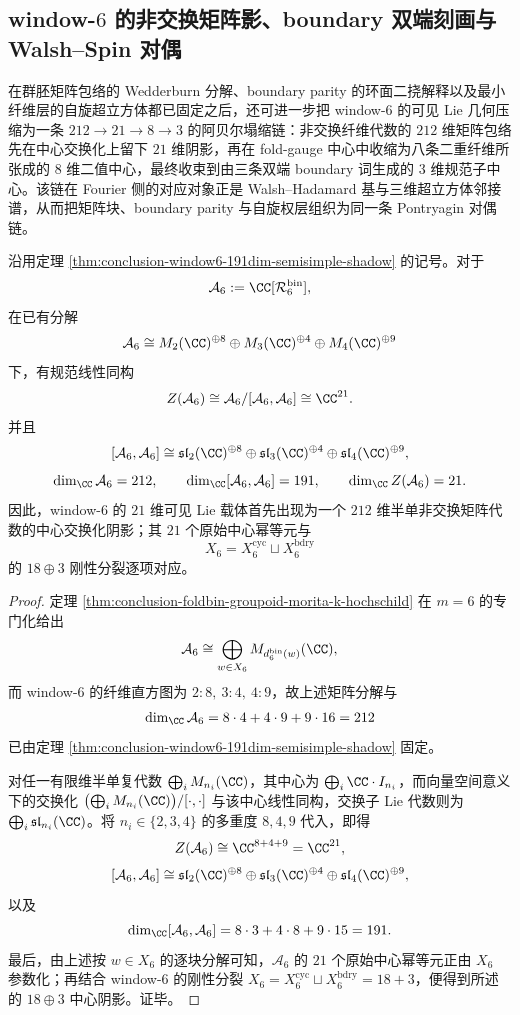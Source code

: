 \subsection{window-\texorpdfstring{$6$}{6} 的非交换矩阵影、boundary 双端刻画与 Walsh--Spin 对偶}\label{subsec:conclusion-window6-matrix-shadow-boundary-walsh-duality}
在群胚矩阵包络的 Wedderburn 分解、boundary parity 的环面二挠解释以及最小纤维层的自旋超立方体都已固定之后，还可进一步把 window-\(6\) 的可见 Lie 几何压缩为一条 \(212\to 21\to 8\to 3\) 的阿贝尔塌缩链：非交换纤维代数的 \(212\) 维矩阵包络先在中心交换化上留下 \(21\) 维阴影，再在 fold-gauge 中心中收缩为八条二重纤维所张成的 \(8\) 维二值中心，最终收束到由三条双端 boundary 词生成的 \(3\) 维规范子中心。该链在 Fourier 侧的对应对象正是 Walsh--Hadamard 基与三维超立方体邻接谱，从而把矩阵块、boundary parity 与自旋权层组织为同一条 Pontryagin 对偶链。

\begin{theorem}\label{thm:conclusion-window6-matrix-envelope-abelian-shadow}
沿用定理 \ref{thm:conclusion-window6-191dim-semisimple-shadow} 的记号。对于
\[
\mathcal A_6:=\CC[\mathcal R_6^{\mathrm{bin}}],
\]
在已有分解
\[
\mathcal A_6
\cong
M_2(\CC)^{\oplus 8}\oplus M_3(\CC)^{\oplus 4}\oplus M_4(\CC)^{\oplus 9}
\]
下，有规范线性同构
\[
Z(\mathcal A_6)
\cong
\mathcal A_6/[\mathcal A_6,\mathcal A_6]
\cong
\CC^{21}.
\]
并且
\[
[\mathcal A_6,\mathcal A_6]
\cong
\mathfrak{sl}_2(\CC)^{\oplus 8}
\oplus
\mathfrak{sl}_3(\CC)^{\oplus 4}
\oplus
\mathfrak{sl}_4(\CC)^{\oplus 9},
\]
\[
\dim_{\CC}\mathcal A_6=212,\qquad
\dim_{\CC}[\mathcal A_6,\mathcal A_6]=191,\qquad
\dim_{\CC} Z(\mathcal A_6)=21.
\]
因此，window-\(6\) 的 \(21\) 维可见 Lie 载体首先出现为一个 \(212\) 维半单非交换矩阵代数的中心交换化阴影；其 \(21\) 个原始中心幂等元与
\[
X_6=X_6^{\mathrm{cyc}}\sqcup X_6^{\mathrm{bdry}}
\]
的 \(18\oplus 3\) 刚性分裂逐项对应。
\end{theorem}
\begin{proof}
定理 \ref{thm:conclusion-foldbin-groupoid-morita-k-hochschild} 在 \(m=6\) 的专门化给出
\[
\mathcal A_6
\cong
\bigoplus_{w\in X_6} M_{d_6^{\mathrm{bin}}(w)}(\CC),
\]
而 window-\(6\) 的纤维直方图为 \(2:8,\ 3:4,\ 4:9\)，故上述矩阵分解与
\[
\dim_{\CC}\mathcal A_6=8\cdot 4+4\cdot 9+9\cdot 16=212
\]
已由定理 \ref{thm:conclusion-window6-191dim-semisimple-shadow} 固定。

对任一有限维半单复代数 \(\bigoplus_i M_{n_i}(\CC)\)，其中心为 \(\bigoplus_i \CC\cdot I_{n_i}\)，而向量空间意义下的交换化 \(\bigl(\bigoplus_i M_{n_i}(\CC)\bigr)/[\cdot,\cdot]\) 与该中心线性同构，交换子 Lie 代数则为 \(\bigoplus_i \mathfrak{sl}_{n_i}(\CC)\)。将 \(n_i\in\{2,3,4\}\) 的多重度 \(8,4,9\) 代入，即得
\[
Z(\mathcal A_6)\cong \CC^{8+4+9}=\CC^{21},
\]
\[
[\mathcal A_6,\mathcal A_6]
\cong
\mathfrak{sl}_2(\CC)^{\oplus 8}\oplus \mathfrak{sl}_3(\CC)^{\oplus 4}\oplus \mathfrak{sl}_4(\CC)^{\oplus 9},
\]
以及
\[
\dim_{\CC}[\mathcal A_6,\mathcal A_6]
=8\cdot 3+4\cdot 8+9\cdot 15
=191.
\]
最后，由上述按 \(w\in X_6\) 的逐块分解可知，\(\mathcal A_6\) 的 \(21\) 个原始中心幂等元正由 \(X_6\) 参数化；再结合 window-\(6\) 的刚性分裂 \(X_6=X_6^{\mathrm{cyc}}\sqcup X_6^{\mathrm{bdry}}=18+3\)，便得到所述的 \(18\oplus 3\) 中心阴影。证毕。
\end{proof}

